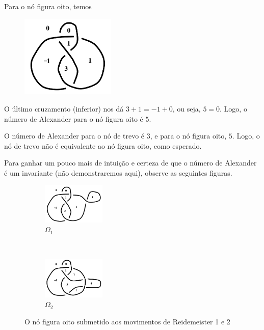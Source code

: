 \documentclass[a4paper,portuguese,11pt,twoside, leqno]{book}
\theoremstyle{definition}
\begin{document}
	\par\vspace{0.3cm} Para o nó figura oito, temos
	\begin{figure}[H]
		\label{no de oito preenchido}
		\begin{center}
			\includegraphics[width=4.5cm]{no_de_oito_preenchido.png}
		\end{center}
	\end{figure}
	\par\vspace{0.3cm} O último cruzamento (inferior) nos dá $3+1=-1+0$, ou seja, $5=0$. Logo, o número de Alexander para o nó figura oito é $5$.
	\par\vspace{0.3cm} O número de Alexander para o nó de trevo é $3$, e para o nó figura oito, $5$. Logo, o nó de trevo não é equivalente ao nó figura oito, como esperado.
	\par\vspace{0.3cm} Para ganhar um pouco mais de intuição e certeza de que o número de Alexander é um invariante (não demonstraremos aqui), observe as seguintes figuras.
	\begin{figure}[H]
		\centering
		\begin{subfigure}[t]{0.5\textwidth}
			\centering
			\includegraphics[width=3cm]{no_de_oito_com_cruzamento_extra.png}
			\caption{$\Omega_1$}
			\label{numero de Alexander e Reidemeister 1}
		\end{subfigure}%
		~
		\begin{subfigure}[t]{0.5\textwidth}
			\centering
			\includegraphics[width=3cm]{no_de_oito_com_corda_por_baixo.png}
			\caption{$\Omega_2$}
			\label{numero de Alexander e Reidemeister 2}
		\end{subfigure}
		\caption{O nó figura oito submetido aos movimentos de Reidemeister 1 e 2}
	\end{figure}
\end{document}
